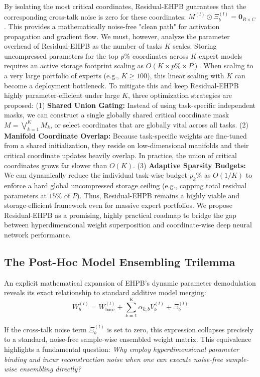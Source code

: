 By isolating the most critical coordinates, Residual-EHPB guarantees that the corresponding cross-talk noise is zero for these coordinates: $M^{(l)} \odot \Xi_b^{(l)} = \mathbf{0}_{R \times C}$. This provides a mathematically noise-free "clean path" for activation propagation and gradient flow. We must, however, analyze the parameter overhead of Residual-EHPB as the number of tasks $K$ scales. Storing uncompressed parameters for the top $p\%$ coordinates across $K$ expert models requires an active storage footprint scaling as $O(K \times p\% \times P)$. When scaling to a very large portfolio of experts (e.g., $K \geq 100$), this linear scaling with $K$ can become a deployment bottleneck. To mitigate this and keep Residual-EHPB highly parameter-efficient under large $K$, three optimization strategies are proposed: (1) \textbf{Shared Union Gating:} Instead of using task-specific independent masks, we can construct a single globally shared critical coordinate mask $M = \bigvee_{k=1}^K M_k$, or select coordinates that are globally vital across all tasks. (2) \textbf{Manifold Coordinate Overlap:} Because task-specific weights are fine-tuned from a shared initialization, they reside on low-dimensional manifolds and their critical coordinate updates heavily overlap. In practice, the union of critical coordinates grows far slower than $O(K)$. (3) \textbf{Adaptive Sparsity Budgets:} We can dynamically reduce the individual task-wise budget $p_k\%$ as $O(1/K)$ to enforce a hard global uncompressed storage ceiling (e.g., capping total residual parameters at $15\%$ of $P$). Thus, Residual-EHPB remains a highly viable and storage-efficient framework even for massive expert portfolios. We propose Residual-EHPB as a promising, highly practical roadmap to bridge the gap between hyperdimensional weight superposition and coordinate-wise deep neural network performance.

\subsection{The Post-Hoc Model Ensembling Trilemma}
\label{subsec:ensembling_trilemma}

An explicit mathematical expansion of EHPB's dynamic parameter demodulation reveals its exact relationship to standard additive model merging:
\begin{equation}
W_b^{(l)} = W_{\text{base}}^{(l)} + \sum_{k=1}^K \alpha_{k, b} V_k^{(l)} + \Xi_b^{(l)}
\end{equation}

If the cross-talk noise term $\Xi_b^{(l)}$ is set to zero, this expression collapses precisely to a standard, noise-free sample-wise ensembled weight matrix. This equivalence highlights a fundamental question: \textit{Why employ hyperdimensional parameter binding and incur reconstruction noise when one can execute noise-free sample-wise ensembling directly?}

